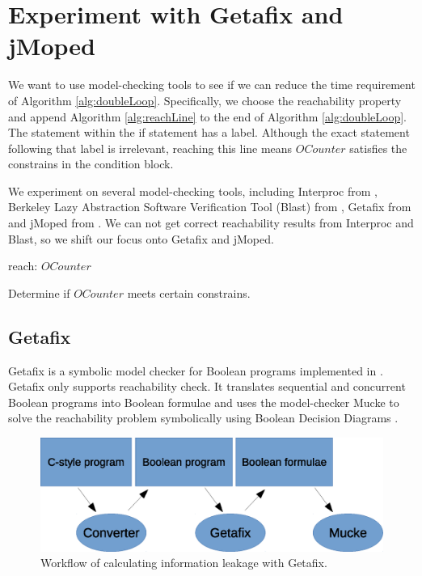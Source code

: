 \chapter{Experiment with Getafix and jMoped}
	\label{CH_03}

We want to use model-checking tools to see if we can reduce the time requirement of Algorithm \ref{alg:doubleLoop}. Specifically, we choose the reachability property and append Algorithm \ref{alg:reachLine} to the end of Algorithm \ref{alg:doubleLoop}. The statement within the if statement has a label. Although the exact statement following that label is irrelevant, reaching this line means $OCounter$ satisfies the constrains in the condition block.

We experiment on several model-checking tools, including Interproc from \cite{_interproc_2011}, Berkeley Lazy Abstraction Software Verification Tool (Blast) from \cite{_mtc_2008}, Getafix from \cite{la_torre_analyzing_2009} and jMoped from \cite{somejMopedCite}. We can not get correct reachability results from Interproc and Blast, so we shift our focus onto Getafix and jMoped.

\renewcommand{\algorithmiccomment}[1]{// #1}
\begin{algorithm}
\begin{algorithmic}

\STATE reach: $OCounter$
\ENDIF

\end{algorithmic}

\caption[Single loop]{Determine if $OCounter$ meets certain constrains.}
\label{alg:reachLine}
\end{algorithm}

\section{Getafix}
Getafix is a symbolic model checker for Boolean programs implemented in \cite{la_torre_analyzing_2009}. Getafix only supports reachability check. It translates sequential and concurrent Boolean programs into Boolean formulae and uses the model-checker Mucke to solve the reachability problem symbolically using Boolean Decision Diagrams \cite{_getafix_2009}. 

\begin{figure}
\centering
\includegraphics[scale=0.8]{Figures/workFlow}
\caption{Workflow of calculating information leakage with Getafix.}
\label{fig:workFlow}
\end{figure}

